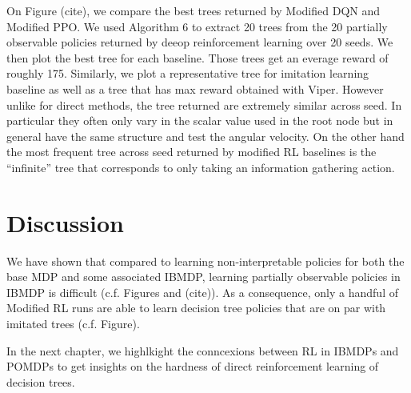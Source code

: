 On Figure (cite), we compare the best trees returned by Modified DQN and Modified PPO. We used Algorithm 6 to extract 20 trees from the 20 partially observable policies returned by deeop reinforcement learning over 20 seeds. We then plot the best tree for each baseline. Those trees get an everage reward of roughly 175.
Similarly, we plot a representative tree for imitation learning baseline as well as a tree that has max reward obtained with Viper. 
However unlike for direct methods, the tree returned are extremely similar across seed. In particular they often only vary in the scalar value used in the root node but in general have the same structure and test the angular velocity.
On the other hand the most frequent tree across seed returned by modified RL baselines is the ``infinite'' tree that corresponds to only taking an information gathering action.


\section{Discussion}
We have shown that compared to learning non-interpretable policies for both the base MDP and some associated IBMDP, learning partially observable policies in IBMDP is difficult (c.f. Figures and (cite)). 
As a consequence, only a handful of Modified RL runs are able to learn decision tree policies that are on par with imitated trees (c.f. Figure).

In the next chapter, we highlkight the conncexions between RL in IBMDPs and POMDPs to get insights on the hardness of direct reinforcement learning of decision trees.